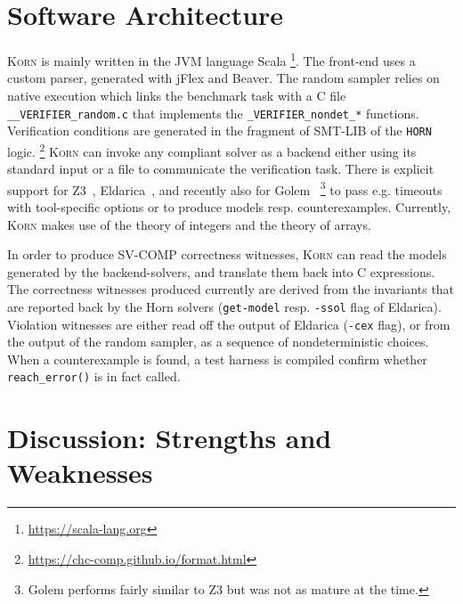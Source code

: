 \documentclass{llncs}
\newcommand{\Korn}{\textsc{Korn}\xspace}
\begin{document}
\section{Software Architecture}
\label{sec:architecture}

\Korn is mainly written in the JVM language Scala
    \footnote{\url{https://scala-lang.org}}.
The front-end uses a custom parser, generated with jFlex and Beaver.
The random sampler relies on native execution which links
the benchmark task with a C file \verb!__VERIFIER_random.c!
that implements the \verb!_VERIFIER_nondet_*! functions.
Verification conditions are generated in the fragment of SMT-LIB of the \texttt{HORN} logic.%
    \footnote{\url{https://chc-comp.github.io/format.html}}
\Korn can invoke any compliant solver as a backend either using its standard input or a file to communicate the verification task.
There is explicit support for Z3~\cite{gurfinkel2019science}, Eldarica~\cite{hojjat2018eldarica}, and recently also for Golem~\cite{blicha2022split}%
    \footnote{Golem performs fairly similar to Z3 but was not as mature at the time.}
to pass e.g. timeouts with tool-specific options or to produce models resp. counterexamples.
Currently, \Korn makes use of the theory of integers 
and the theory of arrays.

In order to produce SV-COMP correctness witnesses, \Korn can read the models generated by the backend-solvers, and translate them back into C expressions.
The correctness witnesses produced currently are derived from
the invariants that are reported back by the Horn solvers (\texttt{get-model} resp. \texttt{-ssol} flag of Eldarica).
Violation witnesses are either read off the output of Eldarica (\texttt{-cex} flag),
or from the output of the random sampler, as a sequence of nondeterministic choices.
When a counterexample is found, a test harness is compiled confirm whether \texttt{reach\_error()} is in fact called.

\section{Discussion: Strengths and Weaknesses}
\label{sec:discussion}
\end{document}
